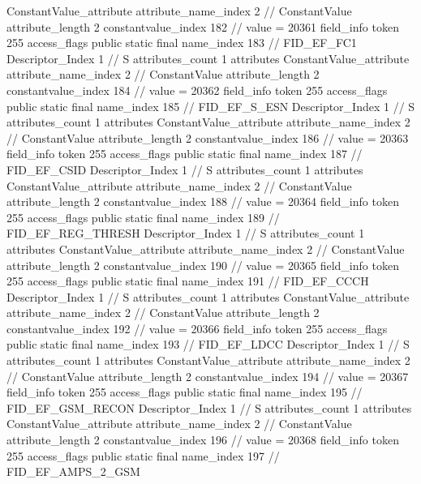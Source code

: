 {{{{{{				ConstantValue_attribute {
					attribute_name_index	2		// ConstantValue
					attribute_length	2
					constantvalue_index	182		// value = 20361
				}
				}
			}
			field_info {
				token	255
				access_flags	public static final
				name_index	183		// FID_EF_FC1
				Descriptor_Index	1		// S
				attributes_count	1
				attributes {
				ConstantValue_attribute {
					attribute_name_index	2		// ConstantValue
					attribute_length	2
					constantvalue_index	184		// value = 20362
				}
				}
			}
			field_info {
				token	255
				access_flags	public static final
				name_index	185		// FID_EF_S_ESN
				Descriptor_Index	1		// S
				attributes_count	1
				attributes {
				ConstantValue_attribute {
					attribute_name_index	2		// ConstantValue
					attribute_length	2
					constantvalue_index	186		// value = 20363
				}
				}
			}
			field_info {
				token	255
				access_flags	public static final
				name_index	187		// FID_EF_CSID
				Descriptor_Index	1		// S
				attributes_count	1
				attributes {
				ConstantValue_attribute {
					attribute_name_index	2		// ConstantValue
					attribute_length	2
					constantvalue_index	188		// value = 20364
				}
				}
			}
			field_info {
				token	255
				access_flags	public static final
				name_index	189		// FID_EF_REG_THRESH
				Descriptor_Index	1		// S
				attributes_count	1
				attributes {
				ConstantValue_attribute {
					attribute_name_index	2		// ConstantValue
					attribute_length	2
					constantvalue_index	190		// value = 20365
				}
				}
			}
			field_info {
				token	255
				access_flags	public static final
				name_index	191		// FID_EF_CCCH
				Descriptor_Index	1		// S
				attributes_count	1
				attributes {
				ConstantValue_attribute {
					attribute_name_index	2		// ConstantValue
					attribute_length	2
					constantvalue_index	192		// value = 20366
				}
				}
			}
			field_info {
				token	255
				access_flags	public static final
				name_index	193		// FID_EF_LDCC
				Descriptor_Index	1		// S
				attributes_count	1
				attributes {
				ConstantValue_attribute {
					attribute_name_index	2		// ConstantValue
					attribute_length	2
					constantvalue_index	194		// value = 20367
				}
				}
			}
			field_info {
				token	255
				access_flags	public static final
				name_index	195		// FID_EF_GSM_RECON
				Descriptor_Index	1		// S
				attributes_count	1
				attributes {
				ConstantValue_attribute {
					attribute_name_index	2		// ConstantValue
					attribute_length	2
					constantvalue_index	196		// value = 20368
				}
				}
			}
			field_info {
				token	255
				access_flags	public static final
				name_index	197		// FID_EF_AMPS_2_GSM
}}}}}
